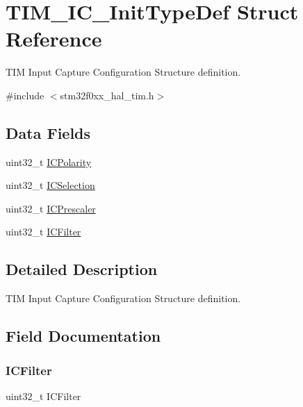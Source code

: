 \hypertarget{struct_t_i_m___i_c___init_type_def}{}\section{T\+I\+M\+\_\+\+I\+C\+\_\+\+Init\+Type\+Def Struct Reference}
\label{struct_t_i_m___i_c___init_type_def}


T\+IM Input Capture Configuration Structure definition.  




{\ttfamily \#include $<$stm32f0xx\+\_\+hal\+\_\+tim.\+h$>$}

\subsection*{Data Fields}
\begin{DoxyCompactItemize}
\item 
uint32\+\_\+t \hyperlink{struct_t_i_m___i_c___init_type_def_a6c0364c24e89f17849b0109236112fba}{I\+C\+Polarity}
\item 
uint32\+\_\+t \hyperlink{struct_t_i_m___i_c___init_type_def_a280cec08ad0ea4608ae57523775cc1c0}{I\+C\+Selection}
\item 
uint32\+\_\+t \hyperlink{struct_t_i_m___i_c___init_type_def_adc795cd98eeaa7725743856652cd2b4a}{I\+C\+Prescaler}
\item 
uint32\+\_\+t \hyperlink{struct_t_i_m___i_c___init_type_def_ab621c1517d5345834fcc71eea97156bf}{I\+C\+Filter}
\end{DoxyCompactItemize}


\subsection{Detailed Description}
T\+IM Input Capture Configuration Structure definition. 

\subsection{Field Documentation}
\mbox{\label{struct_t_i_m___i_c___init_type_def_ab621c1517d5345834fcc71eea97156bf}} 
\subsubsection{\texorpdfstring{I\+C\+Filter}{ICFilter}}
{\footnotesize\ttfamily uint32\+\_\+t I\+C\+Filter}

